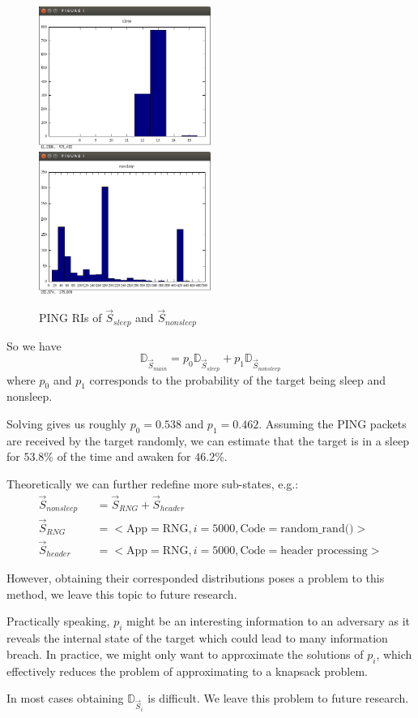 \begin{example}
\begin{figure}
\includegraphics[width=0.5\textwidth]{fig/d_sleep.png}
\includegraphics[width=0.5\textwidth]{fig/d_nonsleep.png}
\caption{PING RIs of $\vec{S}_{sleep}$ and $\vec{S}_{nonsleep}$}
\label{Fig: s_sleep and s_nonsleep}
\end{figure}

So we have
\begin{equation} \label{Eq: sleep}
\mathbb{D}_{\vec{S}_{main}} = p_0 \mathbb{D}_{\vec{S}_{sleep}} + p_1 \mathbb{D}_{\vec{S}_{nonsleep}}
\end{equation}
where $p_0$ and $p_1$ corresponds to the probability of the target being sleep and nonsleep.

Solving  gives us roughly $p_0 = 0.538$ and $p_1 = 0.462$. Assuming the PING packets are received by the target randomly, we can estimate that the target is in a sleep for $53.8\%$ of the time and awaken for $46.2\%$.

Theoretically we can further redefine more sub-states, e.g.:
\begin{eqnarray*}
\vec{S}_{nonsleep} &&= \vec{S}_{RNG} + \vec{S}_{header} \\
\vec{S}_{RNG} &&= <\text{App} = \text{RNG}, i = 5000, \text{Code} = \text{random\_rand()}> \\
\vec{S}_{header} &&= <\text{App} = \text{RNG}, i = 5000, \text{Code} = \text{header processing}> 
\end{eqnarray*}

However, obtaining their corresponded distributions poses a problem to this method, we leave this topic to future research.
\end{example}

Practically speaking, $p_i$ might be an interesting information to an  adversary as it reveals the internal state of the target which could lead to many information breach.  In practice, we might only want to approximate the solutions of $p_i$, which effectively reduces the problem of approximating  to a knapsack problem\cite{knapsack}.

In most cases obtaining $\mathbb{D}_{\vec{S}_i}$ is difficult. We leave this problem to future research.
